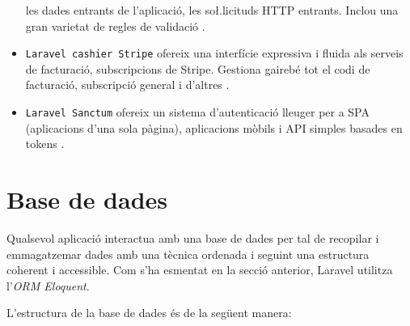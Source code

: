 \begin{itemize}
    les dades entrants de l'aplicació, les so\l.licituds HTTP entrants. Inclou una gran varietat de
    regles de validació \autocite{validacio_dades_laravel}.
    \item \texttt{Laravel cashier Stripe} ofereix una interfície expressiva i fluida als serveis de
    facturació, subscripcions de Stripe. Gestiona gairebé tot el codi de facturació, subscripció general i
    d'altres \autocite{cashier_laravel}.
    \item \texttt{Laravel Sanctum} ofereix un sistema d'autenticació lleuger per a SPA
    (aplicacions d'una sola pàgina), aplicacions mòbils i API simples basades en tokens \autocite{sanctum_laravel}.
\end{itemize}

\section{Base de dades}
\label{chap:base_dades}

Qualsevol aplicació interactua amb una base de dades per tal de recopilar i emmagatzemar dades
amb una tècnica ordenada i seguint una estructura coherent i accessible.
Com s'ha esmentat en la secció anterior, Laravel utilitza l'\emph{ORM Eloquent}.

L'estructura de la base de dades és de la següent manera:

